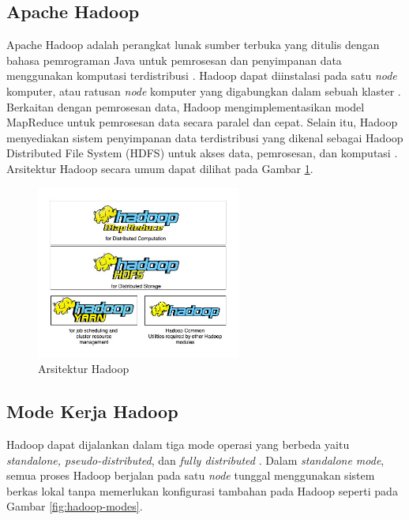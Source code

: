                                                                                                                                                                                                                                                                                                                                                        \subsection{Apache Hadoop}
Apache Hadoop adalah perangkat lunak sumber terbuka yang ditulis dengan bahasa pemrograman Java untuk pemrosesan dan penyimpanan data menggunakan komputasi terdistribusi \cite{ApacheHadoop}. Hadoop dapat diinstalasi pada satu \textit{node} komputer, atau ratusan \textit{node} komputer yang digabungkan dalam sebuah klaster \cite{maneasEvolutionHadoopDistributed2018}. Berkaitan dengan pemrosesan data, Hadoop mengimplementasikan model MapReduce untuk pemrosesan data secara paralel dan cepat. Selain itu, Hadoop menyediakan sistem penyimpanan data terdistribusi yang dikenal sebagai Hadoop Distributed File System (HDFS) untuk akses data, pemrosesan, dan komputasi \cite{dabasAnalysisCommentsYoutube2019}. Arsitektur Hadoop secara umum dapat dilihat pada Gambar \ref{fig:hadoop-str}.

\begin{figure}[h!]
    \centering
    \includegraphics[width=0.6\textwidth]{figures/ch02/hadoop-str}
    \caption{Arsitektur Hadoop}
    \label{fig:hadoop-str}
\end{figure}

\subsection{Mode Kerja Hadoop}
Hadoop dapat dijalankan dalam tiga mode operasi yang berbeda yaitu \textit{standalone, pseudo-distributed}, dan \textit{fully distributed} \cite{johnDataLakeEnterprises2017}. Dalam \textit{standalone mode}, semua proses Hadoop berjalan pada satu \textit{node} tunggal menggunakan sistem berkas lokal tanpa memerlukan konfigurasi tambahan pada Hadoop seperti pada Gambar \ref{fig:hadoop-modes}. 

